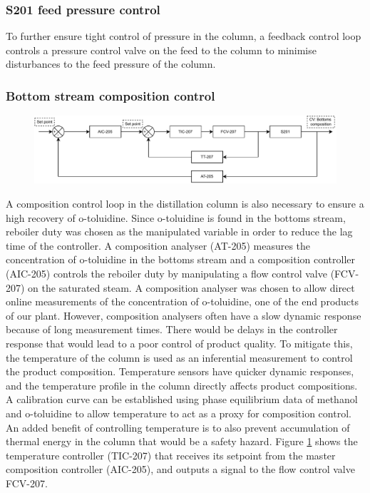 \subsubsection{S201 feed pressure control} %
To further ensure tight control of pressure in the column, a feedback control loop controls a pressure control valve on the feed to the column to minimise disturbances to the feed pressure of the column.



\subsubsection{Bottom stream composition control} %
\begin{figure}
    \centering
    \includegraphics[width=\linewidth]{chapters/4-operation-control/4-Figures/S201-CC.pdf}
    \caption{}
    \label{fig:S201-CC}
\end{figure}
A composition control loop in the distillation column is also necessary to ensure a high recovery of o-toluidine. Since o-toluidine is found in the bottoms stream, reboiler duty was chosen as the manipulated variable in order to reduce the lag time of the controller. A composition analyser (AT-205) measures the concentration of o-toluidine in the bottoms stream and a composition controller (AIC-205) controls the reboiler duty by manipulating a flow control valve (FCV-207) on the saturated steam. 
A composition analyser was chosen to allow direct online measurements of the concentration of o-toluidine, one of the end products of our plant. However, composition analysers often have a slow dynamic response because of long measurement times. There would be delays in the controller response that would lead to a poor control of product quality. To mitigate this, the temperature of the column is used as an inferential measurement to control the product composition. Temperature sensors have quicker dynamic responses, and the temperature profile in the column directly affects product compositions. A calibration curve can be established using phase equilibrium data of methanol and o-toluidine to allow temperature to act as a proxy for composition control. An added benefit of controlling temperature is to also prevent accumulation of thermal energy in the column that would be a safety hazard. Figure \ref{fig:S201-CC} shows the temperature controller (TIC-207) that receives its setpoint from the master composition controller (AIC-205), and outputs a signal to the flow control valve FCV-207.




